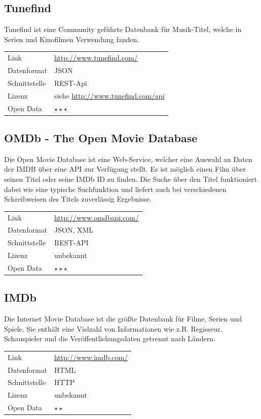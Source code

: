 \documentclass[parskip]{scrartcl}
\begin{document}
\subsection{Tunefind}
\label{subsec:tunefind}

Tunefind ist eine Community geführte Datenbank für Musik-Titel, welche in Serien und Kinofilmen Verwendung fanden.

\begin{tabular}{l|p{9cm}}
	Link & \url{http://www.tunefind.com/} \\
 	Datenformat & JSON \\
 	Schnittstelle & REST-Api \\
 	Lizenz & siehe \url{http://www.tunefind.com/api} \\
 	Open Data & $\star\star\star$ \\
\end{tabular}

\subsection{OMDb - The Open Movie Database}

Die Open Movie Database ist eine Web-Service, welcher eine Auswahl an Daten der IMDB über eine API zur Verfügung stellt. Es ist möglich einen Film über seinen  Titel oder seine IMDb ID zu finden. Die Suche über den Titel funktioniert dabei wie eine typische Suchfunktion und liefert auch bei verschiedenen Schreibweisen des Titels zuverlässig Ergebnisse.

\begin{tabular}{l|p{9cm}}
    Link & \url{http://www.omdbapi.com/} \\
    Datenformat & JSON, XML \\
    Schnittstelle & REST-API \\
    Lizenz & unbekannt \\
    Open Data & $\star\star\star$ \\
\end{tabular}

\subsection{IMDb}

Die Internet Movie Database ist die größte Datenbank für Filme, Serien und Spiele. Sie enthält eine Vielzahl von Informationen wie z.B. Regisseur, Schauspieler und die Veröffentlichungsdaten getrennt nach Ländern.

\begin{tabular}{l|p{9cm}}
	Link & \url{http://www.imdb.com/} \\
 	Datenformat & HTML \\
 	Schnittstelle & HTTP \\
 	Lizenz & unbekannt \\
 	Open Data & $\star\star$ \\
\end{tabular}
\end{document}
